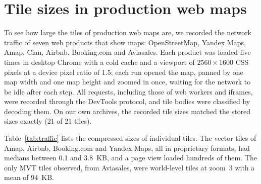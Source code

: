 
\appendix
\section{Tile sizes in production web maps}
\label{app:traffic}

To see how large the tiles of production web maps are, we recorded the network traffic
of seven web products that show maps: OpenStreetMap, Yandex Maps, Amap, Cian, Airbnb,
Booking.com and Aviasales. Each product was loaded five times in desktop Chrome with a
cold cache and a viewport of $2560\times1600$ CSS pixels at a device pixel ratio of 1.5;
each run opened the map, panned by one map width and one map height and zoomed in once,
waiting for the network to be idle after each step. All requests, including those of web
workers and iframes, were recorded through the DevTools protocol, and tile bodies were
classified by decoding them. On our own archives, the recorded tile sizes matched the
stored sizes exactly (21 of 21 tiles).

Table~\ref{tab:traffic} lists the compressed sizes of individual tiles. The vector tiles
of Amap, Airbnb, Booking.com and Yandex Maps, all in proprietary formats, had medians
between 0.1 and 3.8~KB, and a page view loaded hundreds of them. The only MVT tiles
observed, from Aviasales, were world-level tiles at zoom~3 with a mean of 94~KB.

